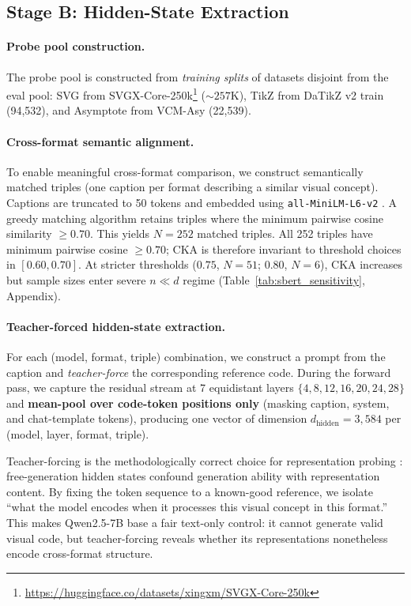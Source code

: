 \subsection{Stage B: Hidden-State Extraction}
\label{sec:stage-b}

\paragraph{Probe pool construction.}
The probe pool is constructed from \emph{training splits} of datasets disjoint from the eval pool: SVG from SVGX-Core-250k\footnote{\url{https://huggingface.co/datasets/xingxm/SVGX-Core-250k}} (${\sim}257$K), TikZ from DaTikZ v2 train \cite{datikz} (94{,}532), and Asymptote from VCM-Asy \cite{viscoder2} (22{,}539).

\paragraph{Cross-format semantic alignment.}
To enable meaningful cross-format comparison, we construct semantically matched triples (one caption per format describing a similar visual concept).
Captions are truncated to 50 tokens and embedded using \texttt{all-MiniLM-L6-v2} \cite{reimers2019sbert}.
A greedy matching algorithm retains triples where the minimum pairwise cosine similarity $\geq 0.70$.
This yields $N{=}252$ matched triples.
All 252 triples have minimum pairwise cosine $\geq 0.70$; CKA is therefore invariant to threshold choices in $[0.60, 0.70]$. At stricter thresholds ($0.75$, $N{=}51$; $0.80$, $N{=}6$), CKA increases but sample sizes enter severe $n \ll d$ regime (Table~\ref{tab:sbert_sensitivity}, Appendix).

\paragraph{Teacher-forced hidden-state extraction.}
For each (model, format, triple) combination, we construct a prompt from the caption and \emph{teacher-force} the corresponding reference code.
During the forward pass, we capture the residual stream at 7 equidistant layers $\{4, 8, 12, 16, 20, 24, 28\}$ and \textbf{mean-pool over code-token positions only} (masking caption, system, and chat-template tokens), producing one vector of dimension $d_\text{hidden} = 3{,}584$ per (model, layer, format, triple).

Teacher-forcing is the methodologically correct choice for representation probing \cite{hewitt-manning-2019-structural, belinkov-2022-probing}: free-generation hidden states confound generation ability with representation content.
By fixing the token sequence to a known-good reference, we isolate ``what the model encodes when it processes this visual concept in this format.''
This makes Qwen2.5-7B base a fair text-only control: it cannot generate valid visual code, but teacher-forcing reveals whether its representations nonetheless encode cross-format structure.

